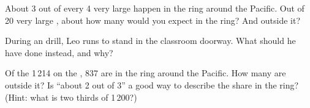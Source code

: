 \begin{exercise}[$\star\star$]\label{exo:g4:volcanoes-earthquakes-first-look:9}
About 3 out of every 4 very large  happen in the ring around the
Pacific. Out of 20 very large , about how many would you expect
in the ring? And outside it?
\end{exercise}

\begin{exercise}[$\star\star$]\label{exo:g4:volcanoes-earthquakes-first-look:10}
During an  drill, Leo runs to stand in the classroom doorway. What
should he have done instead, and why?
\end{exercise}

\begin{exercise}[$\star\star\star$]\label{exo:g4:volcanoes-earthquakes-first-look:11}
Of the 1\,214  on the , 837 are in the ring around the Pacific.
How many are outside it? Is ``about 2 out of 3'' a good way to describe the
share in the ring? (Hint: what is two thirds of 1\,200?)
\end{exercise}

